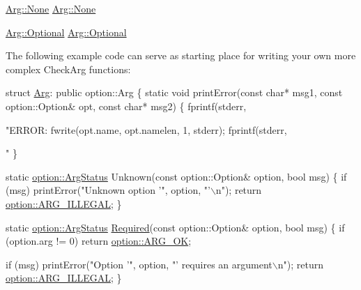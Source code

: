 \begin{DoxyItemize}
\item {\ttfamily \hyperlink{struct_option_parser_1_1_arg_afd9e5e7362e4accc619fe7dee7098956}{Arg\-::\-None}}  \hyperlink{struct_option_parser_1_1_arg_afd9e5e7362e4accc619fe7dee7098956}{Arg\-::\-None} \item {\ttfamily \hyperlink{struct_option_parser_1_1_arg_a3fcea82be66b4aff1971cbab6deabdf1}{Arg\-::\-Optional}}  \hyperlink{struct_option_parser_1_1_arg_a3fcea82be66b4aff1971cbab6deabdf1}{Arg\-::\-Optional} \end{DoxyItemize}
The following example code can serve as starting place for writing your own more complex Check\-Arg functions\-: 
\begin{DoxyCode}
\textcolor{keyword}{struct }\hyperlink{class_arg}{Arg}: \textcolor{keyword}{public} option::Arg
\{
  \textcolor{keyword}{static} \textcolor{keywordtype}{void} printError(\textcolor{keyword}{const} \textcolor{keywordtype}{char}* msg1, \textcolor{keyword}{const} option::Option& opt, \textcolor{keyword}{const} \textcolor{keywordtype}{char}* msg2)
  \{
    fprintf(stderr, \textcolor{stringliteral}{"ERROR: %
    fwrite(opt.name, opt.namelen, 1, stderr);
    fprintf(stderr, \textcolor{stringliteral}{"%
  \}

  \textcolor{keyword}{static} \hyperlink{namespace_option_parser_ad237d47d58c66dea8dcf4f53ac11a6e4}{option::ArgStatus} Unknown(\textcolor{keyword}{const} option::Option& option, \textcolor{keywordtype}{bool} msg)
  \{
    \textcolor{keywordflow}{if} (msg) printError(\textcolor{stringliteral}{"Unknown option '"}, option, \textcolor{stringliteral}{"'\(\backslash\)n"});
    \textcolor{keywordflow}{return} \hyperlink{namespace_option_parser_ad237d47d58c66dea8dcf4f53ac11a6e4a6ea016ff6334ed0d2ec885e96a76c472}{option::ARG\_ILLEGAL};
  \}

  \textcolor{keyword}{static} \hyperlink{namespace_option_parser_ad237d47d58c66dea8dcf4f53ac11a6e4}{option::ArgStatus} \hyperlink{struct_option_parser_1_1_arg_a499af2667b09f9f7f9fa9547dcd36e59}{Required}(\textcolor{keyword}{const} option::Option& option, \textcolor{keywordtype}{bool} msg)
  \{
    \textcolor{keywordflow}{if} (option.arg != 0)
      \textcolor{keywordflow}{return} \hyperlink{namespace_option_parser_ad237d47d58c66dea8dcf4f53ac11a6e4a30360cae1c7e0b0230dc5cca30aaad4e}{option::ARG\_OK};

    \textcolor{keywordflow}{if} (msg) printError(\textcolor{stringliteral}{"Option '"}, option, \textcolor{stringliteral}{"' requires an argument\(\backslash\)n"});
    \textcolor{keywordflow}{return} \hyperlink{namespace_option_parser_ad237d47d58c66dea8dcf4f53ac11a6e4a6ea016ff6334ed0d2ec885e96a76c472}{option::ARG\_ILLEGAL};
  \}

}}
\end{DoxyCode}
